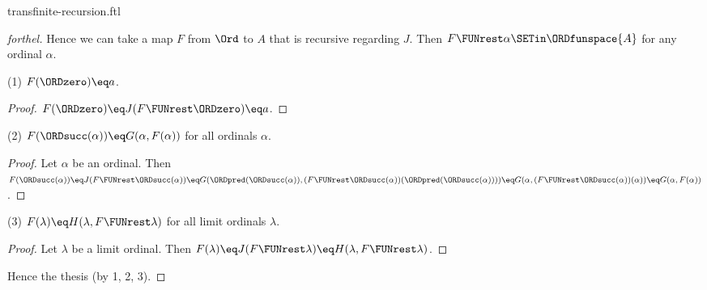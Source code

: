 \documentclass{article}
\begin{document}
\begin{smodule}{transfinite-recursion.ftl}
\begin{proof}[forthel]
  Hence we can take a map $F$ from $\Ord$ to $A$ that is recursive regarding $J$.
  Then $F \FUNrest \alpha \SETin \ORDfunspace{A}$ for any ordinal $\alpha$.

  (1) $F(\ORDzero) \eq a$.
  \begin{proof}
    $F(\ORDzero)
      \eq J(F \FUNrest \ORDzero)
      \eq a$.
  \end{proof}

  (2) $F(\ORDsucc(\alpha)) \eq G(\alpha, F(\alpha))$ for all ordinals $\alpha$.
  \begin{proof}
    Let $\alpha$ be an ordinal.
    Then $F(\ORDsucc(\alpha))
      \eq J(F \FUNrest \ORDsucc(\alpha))
      \eq G(\ORDpred(\ORDsucc(\alpha)), (F \FUNrest \ORDsucc(\alpha))(\ORDpred(\ORDsucc(\alpha))))
      \eq G(\alpha, (F \FUNrest \ORDsucc(\alpha))(\alpha))
      \eq G(\alpha, F(\alpha))$.
  \end{proof}

  (3) $F(\lambda) \eq H(\lambda, F \FUNrest \lambda)$ for all limit ordinals $\lambda$.
  \begin{proof}
    Let $\lambda$ be a limit ordinal.
    Then $F(\lambda)
      \eq J(F \FUNrest \lambda)
      \eq H(\lambda, F \FUNrest \lambda)$.
  \end{proof}

  Hence the thesis (by 1, 2, 3).
\end{proof}

\printbibliography
{}
\end{smodule}
\end{document}
